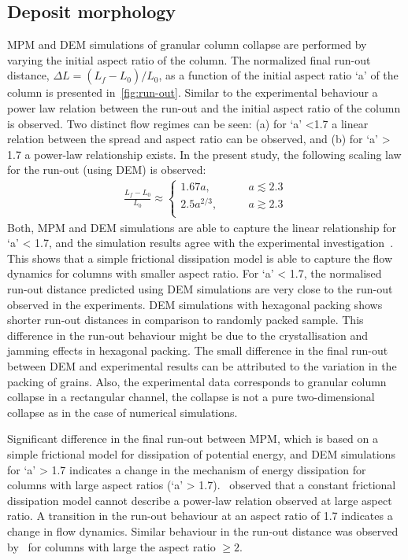 \subsection{Deposit morphology}
MPM and DEM simulations of granular column collapse are 
performed by varying the initial aspect ratio of the column. 
The normalized final run-out distance, $\Delta L = 
(L_{\textit{f}}-L_{\textit{0}})/L_{\textit{0}}$, as a function of the initial 
aspect 
ratio `a' of the column is presented in~\cref{fig:run-out}. Similar to the 
experimental 
behaviour a power law relation between the run-out and the initial aspect ratio 
of the 
column is observed. Two distinct flow regimes can 
be seen: (a) for `a' <1.7 a linear relation between the spread and aspect ratio 
can 
be observed, and (b) for `a' > 1.7 a power-law relationship exists. In the 
present study, 
the following scaling law for the run-out (using DEM) is observed:
\begin{align}
\frac{L_{\textit{f}}-L_{\textit{0}}}{L_{\textit{0}}} \approx  
\begin{cases}
1.67 a, &\qquad \textit{a}\lesssim 2.3 \\
2.5 a^{2/3}, &\qquad \textit{a} \gtrsim 2.3 \\
\end{cases}
\end{align}
Both, MPM and DEM simulations are able to capture the linear relationship for 
`a' < 1.7, and the simulation results agree with the experimental 
investigation~\cite{Lajeunesse2005}. This shows that a simple frictional 
dissipation model is able to capture the flow dynamics for columns with smaller 
aspect ratio. For `a' < 1.7, the normalised run-out distance predicted using 
DEM simulations are very close to the run-out observed in the experiments. DEM 
simulations with hexagonal packing shows shorter run-out distances in 
comparison to randomly packed sample. This difference in the run-out behaviour 
might be due to the crystallisation and jamming effects in hexagonal packing. 
The small difference in the final run-out between DEM and experimental results 
can be attributed to the variation in the packing of grains. Also, the 
experimental data corresponds to granular column collapse in a rectangular 
channel, the collapse is not a pure two-dimensional collapse as in the case 
of numerical simulations. 

Significant difference in the final run-out between MPM, which is based on a 
simple frictional model for dissipation of potential energy, and DEM 
simulations for `a' > 1.7 indicates a change in the mechanism of energy 
dissipation for columns with large aspect ratios (`a' > 
1.7).~\cite{Staron2005b} observed that a constant frictional dissipation 
model cannot describe a power-law relation observed at large aspect ratio. A 
transition in the run-out behaviour at an aspect ratio of 1.7 indicates a 
change in flow dynamics. Similar behaviour in the run-out distance was observed 
by~\citet{Bandara2013} for columns with large the aspect ratio $\ge 2$.

